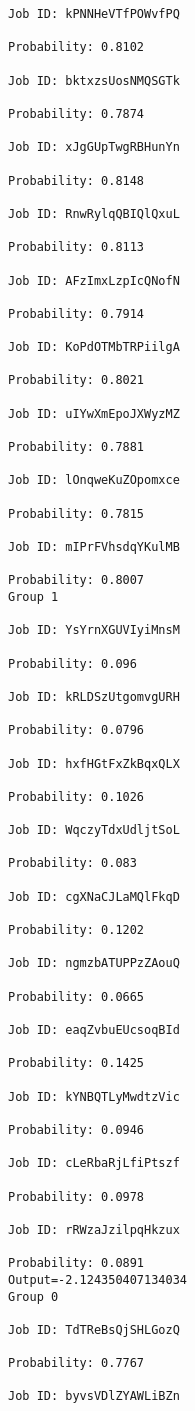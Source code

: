 \documentclass[11pt]{article}
\begin{document}
\begin{Verbatim}[commandchars=\\\{\}]
Job ID: kPNNHeVTfPOWvfPQ

Probability: 0.8102

Job ID: bktxzsUosNMQSGTk

Probability: 0.7874

Job ID: xJgGUpTwgRBHunYn

Probability: 0.8148

Job ID: RnwRylqQBIQlQxuL

Probability: 0.8113

Job ID: AFzImxLzpIcQNofN

Probability: 0.7914

Job ID: KoPdOTMbTRPiilgA

Probability: 0.8021

Job ID: uIYwXmEpoJXWyzMZ

Probability: 0.7881

Job ID: lOnqweKuZOpomxce

Probability: 0.7815

Job ID: mIPrFVhsdqYKulMB

Probability: 0.8007
Group 1

Job ID: YsYrnXGUVIyiMnsM

Probability: 0.096

Job ID: kRLDSzUtgomvgURH

Probability: 0.0796

Job ID: hxfHGtFxZkBqxQLX

Probability: 0.1026

Job ID: WqczyTdxUdljtSoL

Probability: 0.083

Job ID: cgXNaCJLaMQlFkqD

Probability: 0.1202

Job ID: ngmzbATUPPzZAouQ

Probability: 0.0665

Job ID: eaqZvbuEUcsoqBId

Probability: 0.1425

Job ID: kYNBQTLyMwdtzVic

Probability: 0.0946

Job ID: cLeRbaRjLfiPtszf

Probability: 0.0978

Job ID: rRWzaJzilpqHkzux

Probability: 0.0891
Output=-2.124350407134034
Group 0

Job ID: TdTReBsQjSHLGozQ

Probability: 0.7767

Job ID: byvsVDlZYAWLiBZn


\end{Verbatim}
\end{document}
